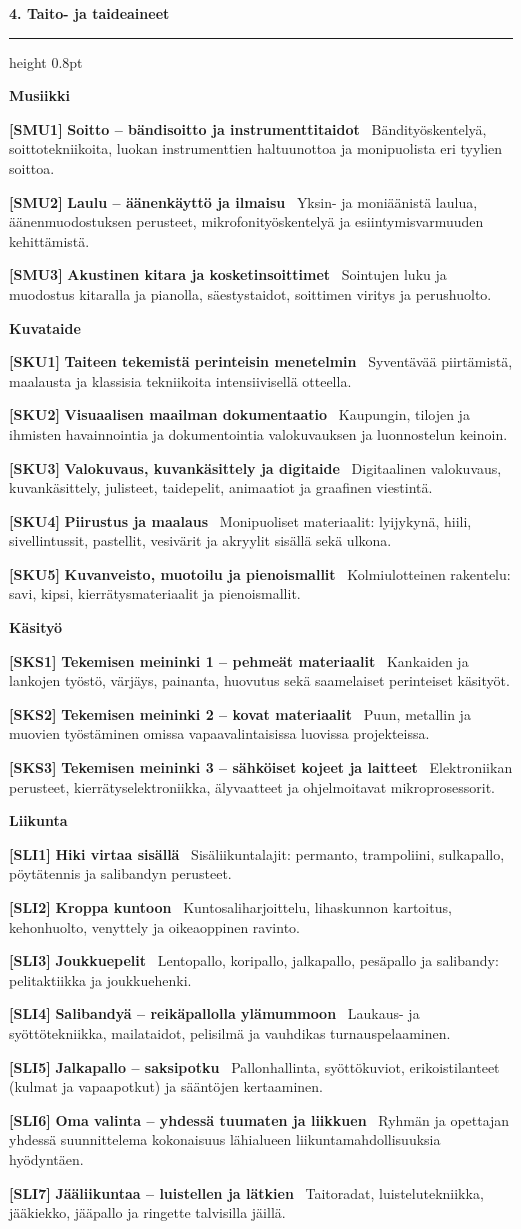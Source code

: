 \documentclass[10pt,a4paper]{article}
\newcommand{\mysection}[1]{%
  \vspace{6pt}%
  {\noindent\large\bfseries\color{brandblue} #1}\par
  \vspace{1pt}%
  {\color{brandblue}\hrule height 0.8pt}%
  \vspace{3pt}%
}
\newcommand{\mysubsection}[1]{%
  \vspace{3pt}%
  {\noindent\normalsize\bfseries\color{accentteal} #1}\par
  \vspace{1pt}%
}
\newcommand{\courseitem}[3]{%
  \noindent\textbf{\color{badgecode}[#1]} \textbf{#2} \textendash\ {\color{textdark}#3}\par\vspace{1.5pt}%
}
\begin{document}
\mysection{4. Taito- ja taideaineet}

\mysubsection{Musiikki}
\courseitem{SMU1}{Soitto -- bändisoitto ja instrumenttitaidot}{Bändityöskentelyä, soittotekniikoita, luokan instrumenttien haltuunottoa ja monipuolista eri tyylien soittoa.}
\courseitem{SMU2}{Laulu -- äänenkäyttö ja ilmaisu}{Yksin- ja moniäänistä laulua, äänenmuodostuksen perusteet, mikrofonityöskentelyä ja esiintymisvarmuuden kehittämistä.}
\courseitem{SMU3}{Akustinen kitara ja kosketinsoittimet}{Sointujen luku ja muodostus kitaralla ja pianolla, säestystaidot, soittimen viritys ja perushuolto.}

\mysubsection{Kuvataide}
\courseitem{SKU1}{Taiteen tekemistä perinteisin menetelmin}{Syventävää piirtämistä, maalausta ja klassisia tekniikoita intensiivisellä otteella.}
\courseitem{SKU2}{Visuaalisen maailman dokumentaatio}{Kaupungin, tilojen ja ihmisten havainnointia ja dokumentointia valokuvauksen ja luonnostelun keinoin.}
\courseitem{SKU3}{Valokuvaus, kuvankäsittely ja digitaide}{Digitaalinen valokuvaus, kuvankäsittely, julisteet, taidepelit, animaatiot ja graafinen viestintä.}
\courseitem{SKU4}{Piirustus ja maalaus}{Monipuoliset materiaalit: lyijykynä, hiili, sivellintussit, pastellit, vesivärit ja akryylit sisällä sekä ulkona.}
\courseitem{SKU5}{Kuvanveisto, muotoilu ja pienoismallit}{Kolmiulotteinen rakentelu: savi, kipsi, kierrätysmateriaalit ja pienoismallit.}

\mysubsection{Käsityö}
\courseitem{SKS1}{Tekemisen meininki 1 -- pehmeät materiaalit}{Kankaiden ja lankojen työstö, värjäys, painanta, huovutus sekä saamelaiset perinteiset käsityöt.}
\courseitem{SKS2}{Tekemisen meininki 2 -- kovat materiaalit}{Puun, metallin ja muovien työstäminen omissa vapaavalintaisissa luovissa projekteissa.}
\courseitem{SKS3}{Tekemisen meininki 3 -- sähköiset kojeet ja laitteet}{Elektroniikan perusteet, kierrätyselektroniikka, älyvaatteet ja ohjelmoitavat mikroprosessorit.}

\mysubsection{Liikunta}
\courseitem{SLI1}{Hiki virtaa sisällä}{Sisäliikuntalajit: permanto, trampoliini, sulkapallo, pöytätennis ja salibandyn perusteet.}
\courseitem{SLI2}{Kroppa kuntoon}{Kuntosaliharjoittelu, lihaskunnon kartoitus, kehonhuolto, venyttely ja oikeaoppinen ravinto.}
\courseitem{SLI3}{Joukkuepelit}{Lentopallo, koripallo, jalkapallo, pesäpallo ja salibandy: pelitaktiikka ja joukkuehenki.}
\courseitem{SLI4}{Salibandyä -- reikäpallolla ylämummoon}{Laukaus- ja syöttötekniikka, mailataidot, pelisilmä ja vauhdikas turnauspelaaminen.}
\courseitem{SLI5}{Jalkapallo -- saksipotku}{Pallonhallinta, syöttökuviot, erikoistilanteet (kulmat ja vapaapotkut) ja sääntöjen kertaaminen.}
\courseitem{SLI6}{Oma valinta -- yhdessä tuumaten ja liikkuen}{Ryhmän ja opettajan yhdessä suunnittelema kokonaisuus lähialueen liikuntamahdollisuuksia hyödyntäen.}
\courseitem{SLI7}{Jääliikuntaa -- luistellen ja lätkien}{Taitoradat, luistelutekniikka, jääkiekko, jääpallo ja ringette talvisilla jäillä.}
\end{document}
